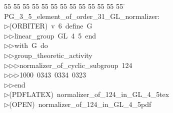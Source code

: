 %
%
\begin{tabbing}
55 \= 55 \= 55 \= 55 \= 55 \= 55 \= 55 \= 55 \= 55 \= 55 \= 55 \= 55 \= 55 \= \kill
PG\_3\_5\_element\_of\_order\_31\_GL\_normalizer:\\[0pt]
$\triangleright$\>(ORBITER)\ v\ 6\ define\ G\ \\[0pt]
$\triangleright$\>$\triangleright$\>linear\_group\ GL\ 4\ 5\ end\ \\[0pt]
$\triangleright$\>$\triangleright$\>with\ G\ do\ \\[0pt]
$\triangleright$\>$\triangleright$\>group\_theoretic\_activity\ \\[0pt]
$\triangleright$\>$\triangleright$\>$\triangleright$\>normalizer\_of\_cyclic\_subgroup\ 124\ \\[0pt]
$\triangleright$\>$\triangleright$\>$\triangleright$\>1000\ 0343\ 0334\ 0323\ \\[0pt]
$\triangleright$\>$\triangleright$\>end\\[0pt]
$\triangleright$\>(PDFLATEX)\ normalizer\_of\_124\_in\_GL\_4\_5tex\\[0pt]
$\triangleright$\>(OPEN)\ normalizer\_of\_124\_in\_GL\_4\_5pdf\\[0pt]
\end{tabbing}
